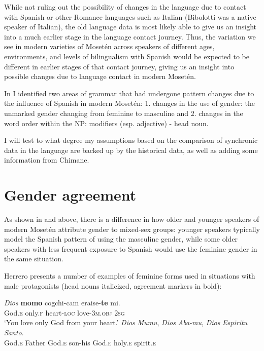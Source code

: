 \documentclass[output=paper,colorlinks,citecolor=brown
]{langscibook}
\begin{document}
While not ruling out the possibility of changes in the language due to contact with Spanish or other Romance languages such as Italian (Bibolotti was a native speaker of Italian), the old language data is most likely able to give us an insight into a much earlier stage in the language contact journey. Thus, the variation we see in modern varieties of Mosetén across speakers of different ages, environments, and levels of bilingualism with Spanish would be expected to be different in earlier stages of that contact journey, giving us an insight into possible changes due to language contact in modern Mosetén.

In \citet{sakel2007moseten} I identified two areas of grammar that had undergone pattern changes due to the influence of Spanish in modern Mosetén: 1. changes in the use of gender: the unmarked gender changing from feminine to masculine and 2. changes in the word order within the NP: modifiers (esp. adjective) - head noun.

I will test to what degree my assumptions based on the comparison of synchronic data in the language are backed up by the historical data, as well as adding some information from Chimane.

\section{Gender agreement}
As shown in  and  above, there is a difference in how older and younger speakers of modern Mosetén attribute gender to mixed-sex groups: younger speakers typically model the Spanish pattern of using the masculine gender, while some older speakers with less frequent exposure to Spanish would use the feminine gender in the same situation. 

Herrero  presents a number of examples of feminine forms used in situations with male protagonists (head nouns italicized, agreement markers in bold):

\ea \label{sakel_example_6}
\gll \emph{Dios} 	\textbf{momo}	cogchi-cam 	eraise-\textbf{te} 	mi.\\
     God.\textsc{e}	only.\textsc{f}	heart-\textsc{loc}	love-3\textsc{m.obj}	2\textsc{sg}\\
\glt ‘You love only God from your heart.’
\ex \label{sakel_example_7}
\gll \emph{Dios} \emph{Mumu}, 	\emph{Dios} \emph{Aba-mu},	\emph{Dios} \emph{Espiritu} \emph{Santo}.\\
     God.\textsc{e} Father	God.\textsc{e} son-his	God.\textsc{e} holy.\textsc{e} spirit.\textsc{e}\\
     
\end{document}
